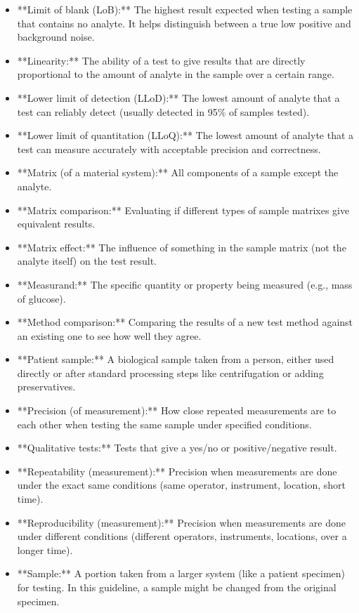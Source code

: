 \documentclass{article}
\begin{document}
\begin{itemize}
    \item **Limit of blank (LoB):** The highest result expected when testing a sample that contains no analyte. It helps distinguish between a true low positive and background noise.
    \item **Linearity:** The ability of a test to give results that are directly proportional to the amount of analyte in the sample over a certain range.
    \item **Lower limit of detection (LLoD):** The lowest amount of analyte that a test can reliably detect (usually detected in 95\% of samples tested).
    \item **Lower limit of quantitation (LLoQ):** The lowest amount of analyte that a test can measure accurately with acceptable precision and correctness.
    \item **Matrix (of a material system):** All components of a sample except the analyte.
    \item **Matrix comparison:** Evaluating if different types of sample matrixes give equivalent results.
    \item **Matrix effect:** The influence of something in the sample matrix (not the analyte itself) on the test result.
    \item **Measurand:** The specific quantity or property being measured (e.g., mass of glucose).
    \item **Method comparison:** Comparing the results of a new test method against an existing one to see how well they agree.
    \item **Patient sample:** A biological sample taken from a person, either used directly or after standard processing steps like centrifugation or adding preservatives.
    \item **Precision (of measurement):** How close repeated measurements are to each other when testing the same sample under specified conditions.
    \item **Qualitative tests:** Tests that give a yes/no or positive/negative result.
    \item **Repeatability (measurement):** Precision when measurements are done under the exact same conditions (same operator, instrument, location, short time).
    \item **Reproducibility (measurement):** Precision when measurements are done under different conditions (different operators, instruments, locations, over a longer time).
    \item **Sample:** A portion taken from a larger system (like a patient specimen) for testing. In this guideline, a sample might be changed from the original specimen.

\end{itemize}
\end{document}
